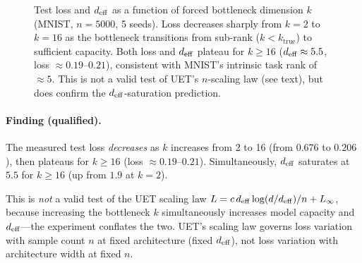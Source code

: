 \begin{figure}[H]
\centering
{}
\caption{Test loss and $d_{\mathrm{eff}}$ as a function of forced bottleneck dimension $k$
(MNIST, $n{=}5000$, 5 seeds). Loss decreases sharply from $k{=}2$ to $k{=}16$
as the bottleneck transitions from sub-rank ($k < k_\mathrm{true}$) to sufficient
capacity. Both loss and $d_{\mathrm{eff}}$ plateau for $k \geq 16$ ($d_{\mathrm{eff}} \approx 5.5$,
loss $\approx 0.19$--$0.21$), consistent with MNIST's intrinsic task rank of ${\approx}5$.
This is not a valid test of UET's $n$-scaling law (see text), but does confirm
the $d_{\mathrm{eff}}$-saturation prediction.}
\label{fig:deff-intervention}
\end{figure}

\paragraph{Finding (qualified).}
The measured test loss \emph{decreases} as $k$ increases from 2 to 16
(from $0.676$ to $0.206$), then plateaus for $k \geq 16$ (loss $\approx 0.19$--$0.21$).
Simultaneously, $d_{\mathrm{eff}}$ saturates at $5.5$ for $k \geq 16$ (up from $1.9$ at $k=2$).

This is \emph{not} a valid test of the UET scaling law $L = c\,d_{\mathrm{eff}}\log(d/d_{\mathrm{eff}})/n + L_\infty$,
because increasing the bottleneck $k$ simultaneously increases model capacity and
$d_{\mathrm{eff}}$---the experiment conflates the two.
UET's scaling law governs loss variation with sample count $n$ at fixed architecture
(fixed $d_{\mathrm{eff}}$), not loss variation with architecture width at fixed $n$.

